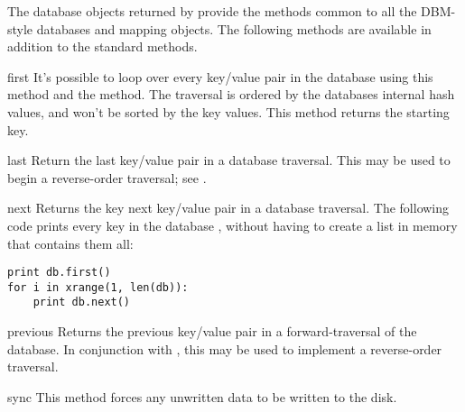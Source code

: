 The database objects returned by  provide the methods 
common to all the DBM-style databases and mapping objects.  The following
methods are available in addition to the standard methods.

\begin{methoddesc}[dbhash]{first}{}
  It's possible to loop over every key/value pair in the database using
  this method   and the  method.  The traversal is ordered by
  the databases internal hash values, and won't be sorted by the key
  values.  This method returns the starting key.
\end{methoddesc}

\begin{methoddesc}[dbhash]{last}{}
  Return the last key/value pair in a database traversal.  This may be used to
  begin a reverse-order traversal; see .
\end{methoddesc}

\begin{methoddesc}[dbhash]{next}{}
  Returns the key next key/value pair in a database traversal.  The
  following code prints every key in the database , without
  having to create a list in memory that contains them all:

\begin{verbatim}
print db.first()
for i in xrange(1, len(db)):
    print db.next()
\end{verbatim}
\end{methoddesc}

\begin{methoddesc}[dbhash]{previous}{}
  Returns the previous key/value pair in a forward-traversal of the database.
  In conjunction with , this may be used to implement
  a reverse-order traversal.
\end{methoddesc}

\begin{methoddesc}[dbhash]{sync}{}
  This method forces any unwritten data to be written to the disk.
\end{methoddesc}
